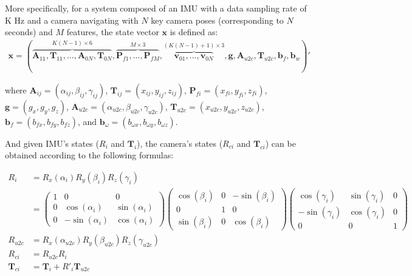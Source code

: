 \documentclass[12pt]{article}   %
\begin{document}
More specifically, for a system composed of an IMU with a data sampling rate of K Hz and a camera navigating with $N$ key camera poses (corresponding to $N$ seconds) and $M$ features, the state vector $\textbf{x}$ is defined as:
\begin{align}
\textbf{x} = (\overbrace{\textbf{A}_{11}, \textbf{T}_{11}, ... , \textbf{A}_{0N}, \textbf{T}_{0N}}^{K(N - 1) \times 6}, \overbrace{\textbf{P}_{f1}, ..., \textbf{P}_{fM}}^{M \times 3}, \overbrace{\textbf{v}_{01}, ..., \textbf{v}_{0N}}^{(K(N-1)+1) \times 3},  \textbf{g}, \textbf{A}_{u2c}, \textbf{T}_{u2c}, \textbf{b}_f, \textbf{b}_w)' 
\end{align}

where
$\textbf{A}_{ij} = (\alpha_{ij}, \beta_{ij}, \gamma_{ij}) $,
$\textbf{T}_{ij} = (x_{ij}, y_{ij}, z_{ij}) $,
$\textbf{P}_{fi} = (x_{fi}, y_{fi}, z_{fi}) $,
$\textbf{g} = (g_{x}, g_{y}, g_{z}) $,
$\textbf{A}_{u2c} = (\alpha_{u2c}, \beta_{u2c}, \gamma_{u2c}) $,
$\textbf{T}_{u2c} = (x_{u2c}, y_{u2c}, z_{u2c}) $,
$\textbf{b}_{f} = (b_{fx}, b_{fy}, b_{fz}) $, and
$\textbf{b}_{\omega} = (b_{\omega x}, b_{\omega y}, b_{\omega z}) $.

And given IMU's states ($R_{i}$ and $\textbf{T}_{i}$), the camera's states ($R_{ci}$ and $\textbf{T}_{ci}$) can be obtained according to the following formulas:

\begin{align}
R_i &= R_{x}(\alpha_i) R_{y}(\beta_i) R_{z}(\gamma_i) \nonumber \\
	&= \begin{pmatrix} 1 & 0 & 0 \\ 0 & \cos(\alpha_i) & \sin(\alpha_i) \\ 0 & -\sin(\alpha_i) & \cos(\alpha_i) \end{pmatrix} \begin{pmatrix} \cos(\beta_i) & 0 & -\sin(\beta_i) \\ 0 & 1 & 0 \\ \sin(\beta_i) &  0 & \cos(\beta_i) \end{pmatrix} \begin{pmatrix} \cos(\gamma_i) & \sin(\gamma_i) & 0 \\ -\sin(\gamma_i) & \cos(\gamma_i) &  0 \\ 0 & 0 & 1 \end{pmatrix} \\
R_{u2c} &= R_{x}(\alpha_{u2c}) R_{y}(\beta_{u2c}) R_{z}(\gamma_{u2c}) \\
R_{ci} &= R_{u2c} R_{i} \\
\textbf{T}_{ci} &= \textbf{T}_{i} + R'_{i} \textbf{T}_{u2c} %
\end{align} 
\end{document}
